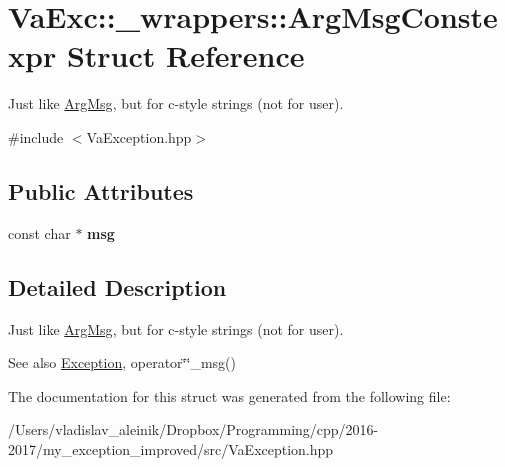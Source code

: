 \hypertarget{struct_va_exc_1_1__wrappers_1_1_arg_msg_constexpr}{}\section{Va\+Exc\+:\+:\+\_\+wrappers\+:\+:Arg\+Msg\+Constexpr Struct Reference}
\label{struct_va_exc_1_1__wrappers_1_1_arg_msg_constexpr}


Just like \hyperlink{struct_va_exc_1_1__wrappers_1_1_arg_msg}{Arg\+Msg}, but for c-\/style strings (not for user).  




{\ttfamily \#include $<$Va\+Exception.\+hpp$>$}

\subsection*{Public Attributes}
\begin{DoxyCompactItemize}
\item 
\mbox{\label{struct_va_exc_1_1__wrappers_1_1_arg_msg_constexpr_a0d538b7c0c2f1217ddbd633876a4bae5}} 
const char $\ast$ {\bfseries msg}
\end{DoxyCompactItemize}


\subsection{Detailed Description}
Just like \hyperlink{struct_va_exc_1_1__wrappers_1_1_arg_msg}{Arg\+Msg}, but for c-\/style strings (not for user). 

\begin{DoxySeeAlso}{See also}
\hyperlink{class_va_exc_1_1_exception}{Exception}, operator\char`\"{}\char`\"{}\+\_\+msg() 
\end{DoxySeeAlso}


The documentation for this struct was generated from the following file\+:\begin{DoxyCompactItemize}
\item 
/\+Users/vladislav\+\_\+aleinik/\+Dropbox/\+Programming/cpp/2016-\/2017/my\+\_\+exception\+\_\+improved/src/Va\+Exception.\+hpp\end{DoxyCompactItemize}
